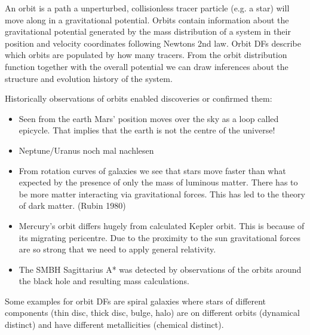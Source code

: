 \par An orbit is a path a unperturbed, collisionless tracer particle (e.g. a star) will move along in a gravitational potential. Orbits contain information about the gravitational potential generated by the mass distribution of a system in their position and velocity coordinates following Newtons 2nd law. Orbit \acp{DF} describe which orbits are populated by how many tracers. From the orbit distribution function together with the overall potential we can draw inferences about the structure and evolution history of the system. 
\par Historically observations of orbits enabled discoveries or confirmed them: 
\begin{itemize}
\item Seen from the earth Mars' position moves over the sky as a loop called epicycle. That implies that the earth is not the centre of the universe! \citep[p.3]{2006ima..book.....C}
\item Neptune/Uranus \color{red} noch mal nachlesen \color{black}
\item From rotation curves of galaxies we see that stars move faster than what expected by the presence of only the mass of luminous matter. There has to be more matter interacting via gravitational forces. This has led to the theory of dark matter. (Rubin 1980)
\item Mercury's orbit differs hugely from calculated Kepler orbit. This is because of its migrating pericentre. Due to the proximity to the sun gravitational forces are so strong that we need to apply general relativity.
\item The \ac{SMBH} Sagittarius A*  was detected by observations of the orbits around the black hole and resulting mass calculations. \citep[p.923]{2006ima..book.....C} 
\end{itemize}
\par Some examples for orbit \acp{DF} are spiral galaxies where stars of different components (thin disc, thick disc, bulge, halo) are on different orbits (dynamical distinct) and have different metallicities (chemical distinct).
